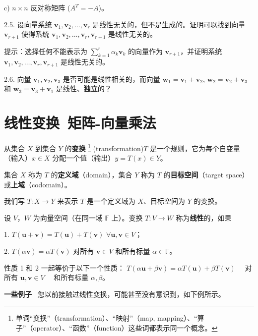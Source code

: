 c) $n \times n$ 反对称矩阵 ($A^T = -A$)。

2.5. 设向量系统 $\mathbf{v}_1, \mathbf{v}_2, \dots, \mathbf{v}_r$ 是线性无关的，但不是生成的。证明可以找到向量 $\mathbf{v}_{r+1}$ 使得系统 $\mathbf{v}_1, \mathbf{v}_2, \dots, \mathbf{v}_r, \mathbf{v}_{r+1}$ 是线性无关的。

提示：选择任何不能表示为 $\sum_{k=1}^r \alpha_k \mathbf{v}_k$ 的向量作为 $\mathbf{v}_{r+1}$，并证明系统 $\mathbf{v}_1, \mathbf{v}_2, \dots, \mathbf{v}_r, \mathbf{v}_{r+1}$ 是线性无关的。

2.6. 向量 $\mathbf{v}_1, \mathbf{v}_2, \mathbf{v}_3$ 是否可能是线性相关的，而向量 $\mathbf{w}_1 = \mathbf{v}_1 + \mathbf{v}_2$, $\mathbf{w}_2 = \mathbf{v}_2 + \mathbf{v}_3$ 和 $\mathbf{w}_3 = \mathbf{v}_3 + \mathbf{v}_1$ 是线性、\textbf{独立}的？



\section{线性变换~矩阵-向量乘法}

从集合 $X$ 到集合 $Y$ 的\textbf{变换}
\footnote{
单词“变换”（transformation）、“映射”（map, mapping）、“算子”（operator）、“函数”（function）这些词都表示同一个概念。
} (transformation)$T$ 是一个规则，它为每个自变量（输入）$x \in X$ 分配一个值（输出）$y = T(x) \in Y$。

集合 $X$ 称为 $T$ 的\textbf{定义域}（domain），集合 $Y$ 称为 $T$ 的\textbf{目标空间}（target space）或\textbf{上域}（codomain）。

我们写 $T: X \to Y$ 来表示 $T$ 是一个定义域为 $X$、目标空间为 $Y$ 的变换。

\begin{definition} 设 $V$，$W$ 为向量空间（在同一域 $\mathbb{F}$ 上）。变换 $T: V \to W$ 称为\textbf{线性}的，如果

1. $T(\mathbf{u} + \mathbf{v}) = T(\mathbf{u}) + T(\mathbf{v})$ $\forall \mathbf{u}, \mathbf{v} \in V$；

2. $T(\alpha \mathbf{v}) = \alpha T(\mathbf{v})$ 对所有 $\mathbf{v} \in V$ 和所有标量 $\alpha \in \mathbb{F}$。
\end{definition}

性质 1 和 2 一起等价于以下一个性质：
$T(\alpha \mathbf{u} + \beta \mathbf{v}) = \alpha T(\mathbf{u}) + \beta T(\mathbf{v})$ ~~对所有 $\mathbf{u}, \mathbf{v} \in V$ ~~和所有标量 $\alpha, \beta$。



\textbf{一些例子}~
您以前接触过线性变换，可能甚至没有意识到，如下例所示。

